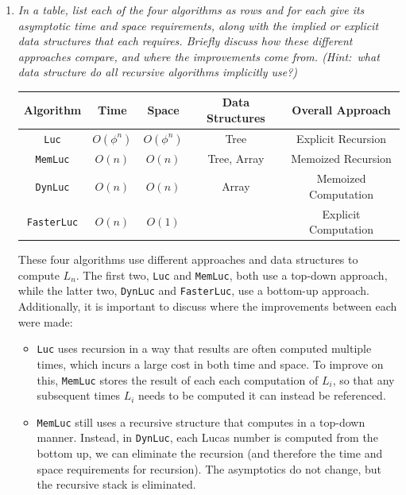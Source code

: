 \documentclass[12pt]{article}
\begin{document}
\begin{enumerate}
\begin{enumerate}
	\newpage
	\item \textit{In a table, list each of the four algorithms as rows and for each give its asymptotic time and space requirements, along with the implied or explicit data structures that each requires. Briefly discuss how 
these different approaches compare, and where the improvements come from. (Hint:\ what data structure do all recursive algorithms implicitly use?)}
	

    \begin{center}
    \begin{tabular}{|c|c|c|c|c|}
        \hline
        Algorithm & Time & Space & Data Structures & Overall Approach\\
        \hline
        {\tt Luc} & $O(\phi^n)$ & $O(\phi^n)$ & Tree & Explicit Recursion\\
        \hline
        {\tt MemLuc} & $O(n)$ & $O(n)$ & Tree, Array & Memoized Recursion\\
        \hline
        {\tt DynLuc} & $O(n)$ & $O(n)$ & Array & Memoized Computation\\
        \hline
        {\tt FasterLuc} & $O(n)$ & $O(1)$ & & Explicit Computation\\
        \hline
    \end{tabular}
    \end{center}
    
    These four algorithms use different approaches and data structures to compute $L_n$. The first two, {\tt Luc} and {\tt MemLuc}, both use a top-down approach, while the latter two, {\tt DynLuc} and {\tt FasterLuc}, use a 
bottom-up approach.\\
    
    Additionally, it is important to discuss where the improvements between each were made:
    \begin{itemize}
        \item {\tt Luc} uses recursion in a way that results are often computed multiple times, which incurs a large cost in both time and space. To improve on this, {\tt MemLuc} stores the result of each each computation of $L_i$, 
so that any subsequent times $L_i$ needs to be computed it can instead be referenced.\\
        
        \item {\tt MemLuc} still uses a recursive structure that computes in a top-down manner. Instead, in {\tt DynLuc}, each Lucas number is computed from the bottom up, we can eliminate the recursion (and therefore the time and 
space requirements for recursion). The asymptotics do not change, but the recursive stack is eliminated.\\
        

\end{itemize}
\end{enumerate}
\end{enumerate}
\end{document}
